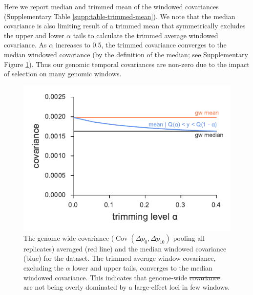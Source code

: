 \documentclass[11pt]{article}
\DeclareMathOperator{\cov}{Cov}
\providecommand{\DIFaddtex}[1]{{\protect\color{blue}\uwave{#1}}} %
\providecommand{\DIFdeltex}[1]{{\protect\color{red}\sout{#1}}}                      %
\providecommand{\DIFaddFL}[1]{\DIFadd{#1}} %
\providecommand{\DIFdelFL}[1]{\DIFdel{#1}} %
\providecommand{\DIFaddbeginFL}{} %
\providecommand{\DIFaddendFL}{} %
\providecommand{\DIFdelbeginFL}{} %
\providecommand{\DIFdelendFL}{} %
\providecommand{\DIFadd}[1]{\texorpdfstring{\DIFaddtex{#1}}{#1}} %
\providecommand{\DIFdel}[1]{\texorpdfstring{\DIFdeltex{#1}}{}} %
\begin{document}
Here we report median and trimmed mean of the windowed covariances
(Supplementary Table \ref{supp:table-trimmed-mean}). We note that the median
covariance is also limiting result of a trimmed mean that symmetrically
excludes the upper and lower $\alpha$ tails to calculate the trimmed average
windowed covariance. As $\alpha$ increases to 0.5, the trimmed covariance
converges to the median windowed covariance (by the definition of the median;
see Supplementary Figure \ref{suppfig:barghi-trimmed-mean}). Thus our genomic
temporal covariances are non-zero due to the impact of selection on many
genomic windows.  


\begin{figure}[!ht]
  \centering
  \includegraphics[]{figures/barghi-trimmed-mean.pdf}

  \caption{The genome-wide covariance (\DIFdelbeginFL \DIFdelFL{$\cov(\Delta p_0, \Delta p_10)$ }\DIFdelendFL \DIFaddbeginFL \DIFaddFL{$\cov(\Delta p_0, \Delta p_{10})$
    }\DIFaddendFL pooling all replicates) averaged (red line) and the median windowed
    covariance (blue) for the \textcite{Barghi2019-qy} dataset. The trimmed
    average window covariance, excluding the $\alpha$ lower and upper tails,
    converges to the median windowed covariance. This indicates that
  genome-wide \DIFdelbeginFL \DIFdelFL{covariance }\DIFdelendFL \DIFaddbeginFL \DIFaddFL{covariances }\DIFaddendFL are not being overly dominated by a large-effect loci
in few windows.}

  \label{suppfig:barghi-trimmed-mean}
\end{figure}



\clearpage
\end{document}
